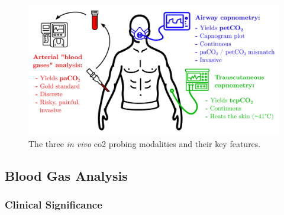 \begin{figure}
	\centering
	\includegraphics[width=.99\linewidth]{1_main_matter/intro_figures/sensors_capno_principle}
	\caption{The three \emph{in vivo} \gls{co2} probing modalities and their key features.}
	\label{fig:three_probing}
\end{figure}

\subsection{Blood Gas Analysis}\label{subsect:bloodgasanal}

\subsubsection{Clinical Significance}\label{subsect:bloodgas_sig}

